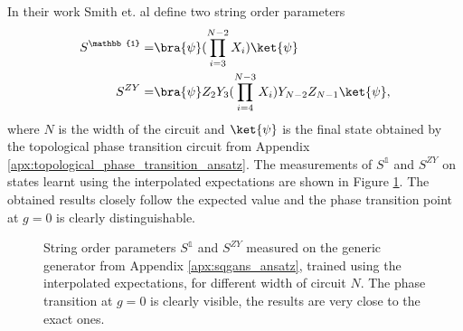 In their work Smith et. al\cite{smith2020crossing} define two
string order parameters
\begin{equation}
\begin{split}
S^\mathbb{1} =  & \bra{\psi}(\prod_{i=3}^{N-2}X_i)\ket{\psi} \\
S^{ZY} =  & \bra{\psi}Z_2Y_3(\prod_{i=4}^{N-3}X_i)Y_{N-2}Z_{N-1}\ket{\psi},
\end{split}
\end{equation}
where $N$ is the width of the circuit and $\ket{\psi}$ is the final state
obtained by the topological phase transition circuit from Appendix
\ref{apx:topological_phase_transition_ansatz}.
The measurements of $S^{\mathbb{1}}$ and $S^{ZY}$ on states learnt using the
interpolated expectations are shown in Figure \ref{fig:string_order_1}. The
obtained results closely follow the expected value and the phase transition
point at $g=0$ is clearly distinguishable.

\begin{figure}[htbp!]
  \captionsetup[subfigure]{labelformat=empty}
  \centering
  \caption{String order parameters $S^\mathbb{1}$ and $S^{ZY}$ measured on the
    generic generator from Appendix \ref{apx:sqgans_ansatz}, trained using the
    interpolated expectations, for different width of circuit $N$.
    The phase transition at $g=0$ is clearly visible,
    the results are very close to the exact ones.}
\label{fig:string_order_1}
\end{figure}

